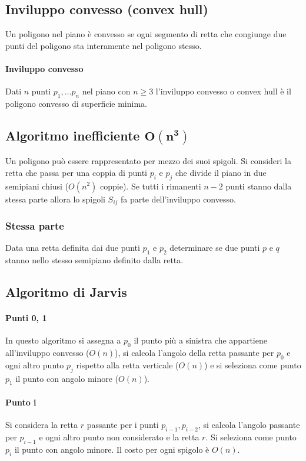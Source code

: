 \subsection{Inviluppo convesso (convex hull)}
Un poligono nel piano \`e convesso se ogni segmento di retta che congiunge due punti del poligono sta interamente nel poligono stesso.
\paragraph{Inviluppo convesso}
Dati $n$ punti $p_1, \dots p_n$ nel piano con $n\ge 3$ l'inviluppo convesso o convex hull \`e il poligono convesso di superficie minima.
\subsection{Algoritmo inefficiente $\mathbf{O(n^3)}$}
Un poligono pu\`o essere rappresentato per mezzo dei suoi spigoli. Si consideri la retta che passa per una coppia di punti $p_i$ e $p_j$ che divide il piano in due semipiani chiusi
($O(n^2)$ coppie). Se tutti i rimanenti $n-2$ punti stanno dalla stessa parte allora lo spigoli $S_{ij}$ fa parte dell'inviluppo convesso.
\subsubsection{Stessa parte}
Data una retta definita dai due punti $p_1$ e $p_2$ determinare se due punti $p$ e $q$ stanno nello stesso semipiano definito dalla retta.\\

\subsection{Algoritmo di Jarvis}
\paragraph{Punti 0, 1}
In questo algoritmo si assegna a $p_0$ il punto pi\`u a sinistra che appartiene all'inviluppo convesso ($O(n)$), si calcola l'angolo della retta passante per $p_0$ e ogni altro punto
$p_j$ rispetto alla retta verticale ($O(n)$) e si seleziona come punto $p_1$ il punto con angolo minore ($O(n)$).
\paragraph{Punto i}
Si considera la retta $r$ passante per i punti $p_{i-1}, p_{i-2}$, si calcola l'angolo passante per $p_{i-1}$ e ogni altro punto non considerato e la retta $r$. Si  seleziona come punto
$p_i$ il punto con angolo minore. Il costo per ogni spigolo \`e $O(n)$.
